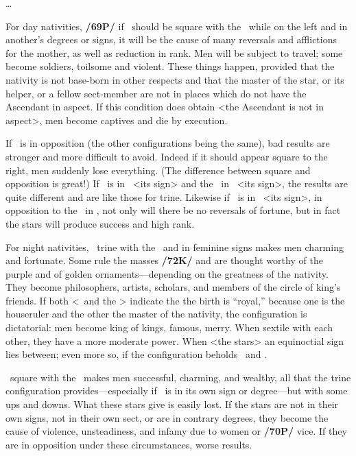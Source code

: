 \ldots

For day nativities, \textbf{/69P/} if \Mars\, \marginnote{\Mars \Square \Moon} should be square with the \Moon\, while on the left and in another’s degrees or signs, it will be the cause of many reversals and afflictions for the mother, as well as reduction in rank. Men will be subject to travel; some become soldiers, toilsome and violent. \mndl These things happen, provided that the nativity is not base-born in other respects and that the master of the star, or its helper, or a fellow sect-member are not in places which do not have the Ascendant in aspect. If this condition does obtain <the Ascendant is not in aspect>, men become captives and die by execution. 

If \Mars\, is in opposition (the other configurations being the same), bad results are stronger and more difficult to avoid. Indeed if it should appear square to the right, men suddenly lose everything. (The difference between square and opposition is great!) \mndl If \Mars\, is in \Aries\, <its sign> and the \Moon\, in \Cancer\, <its sign>, the results are quite different and are like those for trine. \mnmb Likewise if \Mars\, is in \Scorpio\, <its sign>, in opposition to the \Moon\, in \Taurus, not only will there be no reversals of fortune, but in fact the stars will produce success and high rank.

For night nativities, \Venus\, \marginnote{\Venus \Trine \Moon} trine with the \Moon\, and in feminine signs makes men charming and fortunate. Some rule the masses \textbf{/72K/} and are thought worthy of the purple and of golden ornaments—depending on the greatness of the nativity. They become philosophers, artists, scholars, and members of the circle of king’s friends. If both <\Venus\, and the \Moon> indicate the the birth is “royal,” because one is
the houseruler and the other the master of the nativity, the configuration is dictatorial: men become king of kings, famous, merry. When sextile with each other, they have a more moderate power. When <the stars> an equinoctial sign lies between; even more so, if the configuration beholds \Pisces\, and \Taurus.

\Venus\, \marginnote{\Venus \Square \Moon} square with the \Moon\, makes men successful, charming, and wealthy, all that the trine configuration provides—especially if \Venus\, is in its own sign or degree—but with some ups and downs. \mndl What these stars give is easily lost. If the stars are not in their own signs, not in their own sect, or are in contrary degrees, they become the cause of violence, unsteadiness, and infamy due to women or \textbf{/70P/} vice.
If they are in opposition under these circumstances, worse results.

